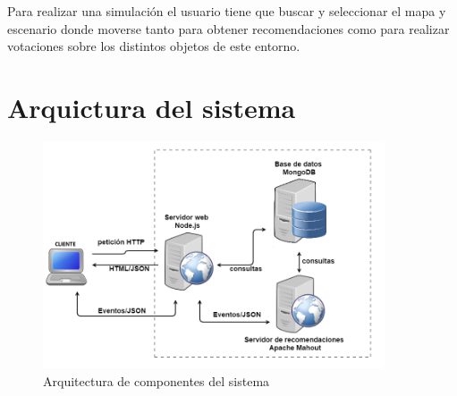Para realizar una simulación el usuario tiene que buscar y seleccionar el mapa y escenario donde moverse tanto para obtener recomendaciones como para realizar votaciones sobre los distintos objetos de este entorno.

\section{Arquictura del sistema}
\thispagestyle{empty}

\begin{figure}[H]
\centering\includegraphics[width=0.9\textwidth]{imagenes/arquitectura-componentes.png}
\caption{Arquitectura de componentes del sistema}
\label{arquitecturaComponentes}
\end{figure}